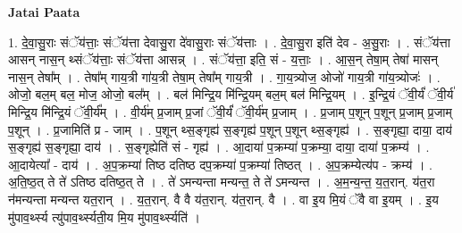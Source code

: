 \documentclass[17pt]{extarticle}
\begin{document}
\textbf{Jatai Paata} \newline

1. दे॒वा॒सु॒राः संॅय॑त्ताः॒ संॅय॑त्ता देवासु॒रा दे॑वासु॒राः संॅय॑त्ताः । . दे॒वा॒सु॒रा इति॑ देव - अ॒सु॒राः । . संॅय॑त्ता आसन् नास॒न् थ्संॅय॑त्ताः॒ संॅय॑त्ता आसन्न् । . संॅय॑त्ता॒ इति॒ सं - य॒त्ताः॒ । . आ॒स॒न् तेषा॒म् तेषा॑ मासन् नास॒न् तेषा᳚म् । . तेषा᳚म् गाय॒त्री गा॑य॒त्री तेषा॒म् तेषा᳚म् गाय॒त्री । . गा॒य॒त्र्योज॒ ओजो॑ गाय॒त्री गा॑य॒त्र्योजः॑ । . ओजो॒ बल॒म् बल॒ मोज॒ ओजो॒ बल᳚म् । . बल॑ मिन्द्रि॒य मि॑न्द्रि॒यम् बल॒म् बल॑ मिन्द्रि॒यम् । . इ॒न्द्रि॒यं ॅवी॒र्यं॑ ॅवी॒र्य॑ मिन्द्रि॒य मि॑न्द्रि॒यं ॅवी॒र्य᳚म् । . वी॒र्य॑म् प्र॒जाम् प्र॒जां ॅवी॒र्यं॑ ॅवी॒र्य॑म् प्र॒जाम् । . प्र॒जाम् प॒शून् प॒शून् प्र॒जाम् प्र॒जाम् प॒शून् । . प्र॒जामिति॑ प्र - जाम् । . प॒शून् थ्स॒ङ्गृह्य॑ स॒ङ्गृह्य॑ प॒शून् प॒शून् थ्स॒ङ्गृह्य॑ । . स॒ङ्गृह्या॒ दाया॒ दाय॑ स॒ङ्गृह्य॑ स॒ङ्गृह्या॒ दाय॑ । . स॒ङ्गृह्येति॑ सं - गृह्य॑ । . आ॒दाया॑ प॒क्रम्या॑ प॒क्रम्या॒ दाया॒ दाया॑ प॒क्रम्य॑ । . आ॒दायेत्या᳚ - दाय॑ । . अ॒प॒क्रम्या॑ तिष्ठ दतिष्ठ दप॒क्रम्या॑ प॒क्रम्या॑ तिष्ठत् । . अ॒प॒क्रम्येत्य॑प - क्रम्य॑ । . अ॒ति॒ष्ठ॒त् ते ते॑ ऽतिष्ठ दतिष्ठ॒त् ते । . ते॑ ऽमन्यन्ता मन्यन्त॒ ते ते॑ ऽमन्यन्त । . अ॒म॒न्य॒न्त॒ य॒त॒रान्. य॑त॒रा न॑मन्यन्ता मन्यन्त यत॒रान् । . य॒त॒रान्. वै वै य॑त॒रान्. य॑त॒रान्. वै । . वा इ॒य मि॒यं ॅवै वा इ॒यम् । . इ॒य मु॑पाव॒र्थ्स्य त्यु॑पाव॒र्थ्स्यती॒य मि॒य मु॑पाव॒र्थ्स्यति॑ । \newline
\end{document}
